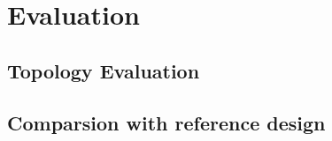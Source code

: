 \chapter{Evaluation}
\label{cha:Evaluation}

\section{Topology Evaluation}

\section{Comparsion with reference design}


